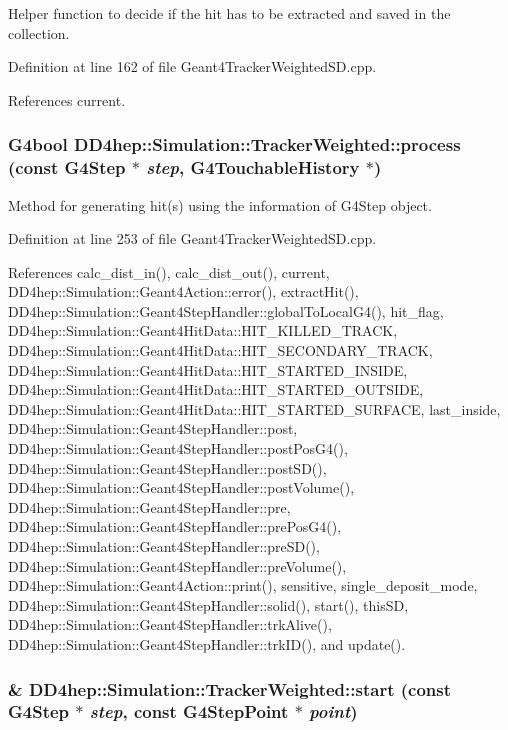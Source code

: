 Helper function to decide if the hit has to be extracted and saved in the collection. 

Definition at line 162 of file Geant4TrackerWeightedSD.cpp.

References current.\hypertarget{struct_d_d4hep_1_1_simulation_1_1_tracker_weighted_ab258cb542897a7bd369fd204eafbb245}{
\subsubsection[{process}]{\setlength{\rightskip}{0pt plus 5cm}G4bool DD4hep::Simulation::TrackerWeighted::process (const G4Step $\ast$ {\em step}, \/  G4TouchableHistory $\ast$)}}
\label{struct_d_d4hep_1_1_simulation_1_1_tracker_weighted_ab258cb542897a7bd369fd204eafbb245}


Method for generating hit(s) using the information of G4Step object. 

Definition at line 253 of file Geant4TrackerWeightedSD.cpp.

References calc\_\-dist\_\-in(), calc\_\-dist\_\-out(), current, DD4hep::Simulation::Geant4Action::error(), extractHit(), DD4hep::Simulation::Geant4StepHandler::globalToLocalG4(), hit\_\-flag, DD4hep::Simulation::Geant4HitData::HIT\_\-KILLED\_\-TRACK, DD4hep::Simulation::Geant4HitData::HIT\_\-SECONDARY\_\-TRACK, DD4hep::Simulation::Geant4HitData::HIT\_\-STARTED\_\-INSIDE, DD4hep::Simulation::Geant4HitData::HIT\_\-STARTED\_\-OUTSIDE, DD4hep::Simulation::Geant4HitData::HIT\_\-STARTED\_\-SURFACE, last\_\-inside, DD4hep::Simulation::Geant4StepHandler::post, DD4hep::Simulation::Geant4StepHandler::postPosG4(), DD4hep::Simulation::Geant4StepHandler::postSD(), DD4hep::Simulation::Geant4StepHandler::postVolume(), DD4hep::Simulation::Geant4StepHandler::pre, DD4hep::Simulation::Geant4StepHandler::prePosG4(), DD4hep::Simulation::Geant4StepHandler::preSD(), DD4hep::Simulation::Geant4StepHandler::preVolume(), DD4hep::Simulation::Geant4Action::print(), sensitive, single\_\-deposit\_\-mode, DD4hep::Simulation::Geant4StepHandler::solid(), start(), thisSD, DD4hep::Simulation::Geant4StepHandler::trkAlive(), DD4hep::Simulation::Geant4StepHandler::trkID(), and update().\hypertarget{struct_d_d4hep_1_1_simulation_1_1_tracker_weighted_abb50962377c010e8430400035d5e3dcf}{
\subsubsection[{start}]{\& DD4hep::Simulation::TrackerWeighted::start (const G4Step $\ast$ {\em step}, \/  const G4StepPoint $\ast$ {\em point})}}
\label{struct_d_d4hep_1_1_simulation_1_1_tracker_weighted_abb50962377c010e8430400035d5e3dcf}


